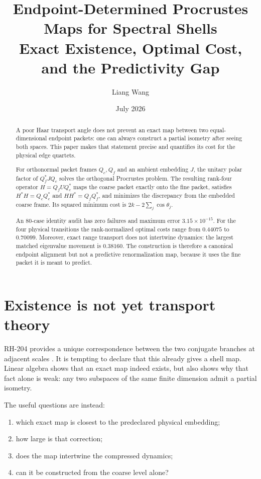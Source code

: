 \documentclass[12pt]{article}
\title{Endpoint-Determined Procrustes Maps for Spectral Shells\\
\large Exact Existence, Optimal Cost, and the Predictivity Gap}
\author{Liang Wang}\date{July 2026}
\theoremstyle{remark}\newtheorem{remark}[theorem]{Remark}
\begin{document}
\maketitle
\begin{abstract}
A poor Haar transport angle does not prevent an exact map between two
equal-dimensional endpoint packets: one can always construct a partial
isometry after seeing both spaces.  This paper makes that statement precise
and quantifies its cost for the physical edge quartets.

For orthonormal packet frames $Q_c,Q_f$ and an ambient embedding $J$, the
unitary polar factor of $Q_f^*JQ_c$ solves the orthogonal Procrustes problem.
The resulting rank-four operator $H=Q_fUQ_c^*$ maps the coarse packet exactly
onto the fine packet, satisfies $H^*H=Q_cQ_c^*$ and $HH^*=Q_fQ_f^*$, and
minimizes the discrepancy from the embedded coarse frame.  Its squared
minimum cost is $2k-2\sum_j\cos\theta_j$.

An 80-case identity audit has zero failures and maximum error
$3.15\times10^{-15}$.  For the four physical transitions the rank-normalized
optimal costs range from $0.44075$ to $0.70099$.  Moreover, exact range
transport does not intertwine dynamics: the largest matched eigenvalue
movement is $0.38160$.  The construction is therefore a canonical
endpoint alignment but not a predictive renormalization map, because it
uses the fine packet it is meant to predict.
\end{abstract}

\section{Existence is not yet transport theory}

RH-204 provides a unique correspondence between the two conjugate branches
at adjacent scales \citep{WangRH204}.  It is tempting to declare that this
already gives a shell map.  Linear algebra shows that an exact map indeed
exists, but also shows why that fact alone is weak: any two subspaces of the
same finite dimension admit a partial isometry.

The useful questions are instead:
\begin{enumerate}[leftmargin=2em]
\item which exact map is closest to the predeclared physical embedding;
\item how large is that correction;
\item does the map intertwine the compressed dynamics;
\item can it be constructed from the coarse level alone?
\end{enumerate}
\end{document}
